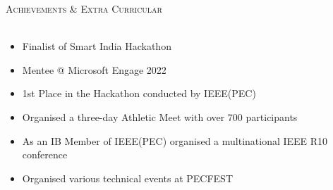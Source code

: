 \documentclass[a4paper]{article}
\newcommand{\lineunder} {
    \vspace*{-8pt} \\
    \hspace*{-18pt} \hrulefill \\
}
\newcommand{\header} [1] {
    {\hspace*{-18pt}\vspace*{6pt} \textsc{#1}}
    \vspace*{-6pt} \lineunder
}
\begin{document}

\header{Achievements \& Extra Curricular}
\begin{itemize} \itemsep -1pt
   \item Finalist of Smart India Hackathon
   \item Mentee @ Microsoft Engage 2022\\
    \item 1st Place in the Hackathon conducted by IEEE(PEC)\\
    \item Organised a three-day Athletic Meet with over 700 participants\\
    \item As an IB Member of IEEE(PEC) organised a multinational IEEE R10 conference\\
    \item Organised various technical events at PECFEST\\
\end{itemize}
\vspace*{1mm}

    \ 
    
\end{document}
